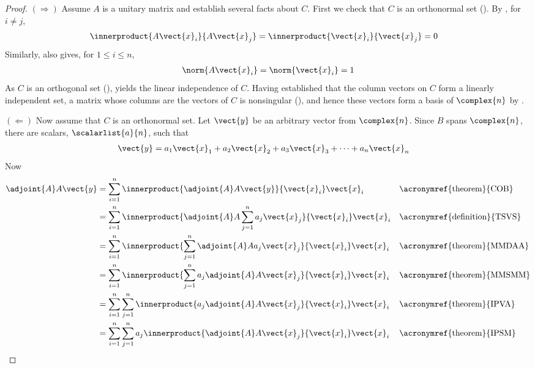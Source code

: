 \begin{proof}
%
$\left(\Rightarrow\right)$\quad
Assume $A$ is a unitary matrix and establish several facts about $C$.  First we check that $C$ is an orthonormal set ().  By , for $i\neq j$,
%
\begin{align*}
\innerproduct{A\vect{x}_i}{A\vect{x}_j}&
=\innerproduct{\vect{x}_i}{\vect{x}_j}=0
\end{align*}
%
Similarly,  also gives, for $1\leq i\leq n$,
%
\begin{align*}
\norm{A\vect{x}_i}=\norm{\vect{x}_i}=1
\end{align*}
%
As $C$ is an orthogonal set (),  yields the linear independence of $C$.  Having established that the column vectors on $C$ form a linearly independent set, a matrix whose columns are the vectors of $C$ is nonsingular (), and hence these vectors form a basis of $\complex{n}$ by .\par
%
$\left(\Leftarrow\right)$\quad
Now assume that $C$ is an orthonormal set.  Let $\vect{y}$ be an arbitrary vector from $\complex{n}$.  Since $B$ spans $\complex{n}$, there are scalars, $\scalarlist{a}{n}$, such that
%
\begin{align*}
\vect{y}&=a_1\vect{x}_1+a_2\vect{x}_2+a_3\vect{x}_3+\cdots+a_n\vect{x}_n
\end{align*}
%
Now
%
\begin{align*}
\adjoint{A}A\vect{y}
&=\sum_{i=1}^{n}\innerproduct{\adjoint{A}A\vect{y}}{\vect{x}_i}\vect{x}_i
&&\text{\acronymref{theorem}{COB}}\\
%
&=\sum_{i=1}^{n}\innerproduct{\adjoint{A}A\sum_{j=1}^{n}a_j\vect{x}_j}{\vect{x}_i}\vect{x}_i
&&\text{\acronymref{definition}{TSVS}}\\
%
&=\sum_{i=1}^{n}\innerproduct{\sum_{j=1}^{n}\adjoint{A}Aa_j\vect{x}_j}{\vect{x}_i}\vect{x}_i
&&\text{\acronymref{theorem}{MMDAA}}\\
%
&=\sum_{i=1}^{n}\innerproduct{\sum_{j=1}^{n}a_j\adjoint{A}A\vect{x}_j}{\vect{x}_i}\vect{x}_i
&&\text{\acronymref{theorem}{MMSMM}}\\
%
&=\sum_{i=1}^{n}\sum_{j=1}^{n}\innerproduct{a_j\adjoint{A}A\vect{x}_j}{\vect{x}_i}\vect{x}_i
&&\text{\acronymref{theorem}{IPVA}}\\
%
&=\sum_{i=1}^{n}\sum_{j=1}^{n}a_j\innerproduct{\adjoint{A}A\vect{x}_j}{\vect{x}_i}\vect{x}_i
&&\text{\acronymref{theorem}{IPSM}}\\

\end{align*}
\end{proof}

